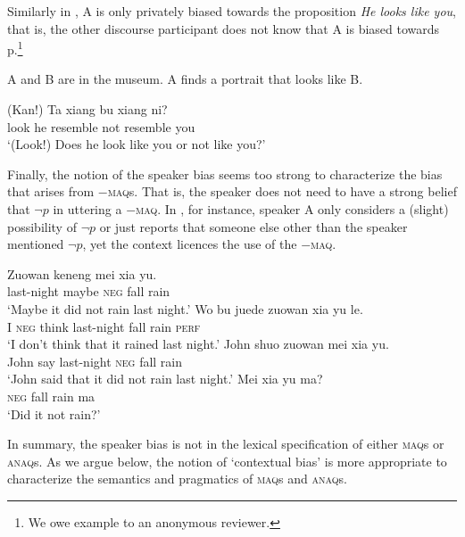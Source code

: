 \documentclass[output=paper,colorlinks,citecolor=brown]{langscibook}
\begin{document}
Similarly in , A is only privately biased towards the proposition \textit{He looks like you}, that is, the other discourse participant does not know that A is biased towards p.\footnote{We owe example  to an anonymous reviewer.}

\begin{exe}
\ex\label{portrait} A and B are in the museum. A finds a portrait that looks like B.
\begin{xlist}
 \gll (Kan!) Ta xiang bu xiang ni?\\
 look he resemble not resemble you\\
\glt `(Look!) Does he look like you or not like you?'
\end{xlist}
\end{exe}



Finally, the notion of the speaker bias seems  too strong to characterize the bias that arises from $-$\textsc{maq}s.  That is, the speaker does not need to have a strong belief that $\neg p$ in uttering a  $-$\textsc{maq}. In , for instance, speaker A only considers a (slight) possibility of $\neg p$ or just reports that someone else other than the speaker mentioned $\neg p$, yet the context licences the use of  the $-$\textsc{maq}.


\ea\label{xiayune3}
\begin{xlist}
 \gll Zuowan keneng mei xia yu. \\
last-night maybe \textsc{neg} fall rain \\
\glt `Maybe it did not rain last night.'
 \gll Wo bu juede zuowan xia yu le.\\
I \textsc{neg} think last-night fall rain \textsc{perf} \\
\glt `I don't think that it rained last night.'
 \gll John shuo zuowan mei xia yu. \\
John say last-night \textsc{neg} fall rain \\
\glt `John said that it did not rain last night.'
 \gll Mei xia yu ma? \\
\textsc{neg} fall rain ma\\
\glt `Did it not rain?' 
\end{xlist}
\z

In summary, the  speaker bias is not in the lexical specification of either \textsc{maq}s or \textsc{anaq}s.  As we argue below,  the notion of `contextual bias' is more appropriate to characterize  the  semantics and pragmatics of \textsc{maq}s and \textsc{anaq}s.
\end{document}
